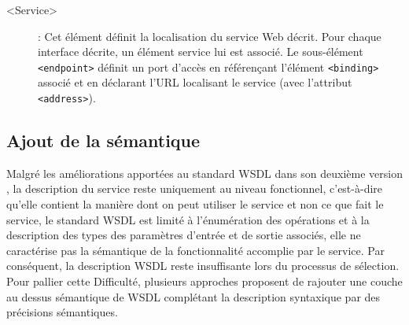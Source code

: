 \begin{description}
	    \item[<Service>]:
		Cet élément définit la localisation du service Web décrit. Pour chaque
		interface décrite, un élément service lui est associé. Le sous-élément \texttt{<endpoint>} définit un
		port d’accès en référençant l’élément \texttt{<binding>} associé et en déclarant l'\textsc{URL} 
		localisant le service (avec l’attribut \texttt{<address>}). 	    	



	\end{description}

        \subsection{Ajout de la sémantique}
	    Malgré les améliorations apportées au standard \textsc{WSDL} dans son deuxième version
	    \cite{chinnici2007web}, la description du service reste uniquement au niveau fonctionnel, 
	    c'est-à-dire qu'elle contient la manière dont on peut utiliser le service et non ce
	    que fait le service, le standard \textsc{WSDL} est limité à l'énumération des opérations et 
	    à la description des types des paramètres d'entrée et de sortie associés, elle ne caractérise 
	    pas la sémantique de la fonctionnalité accomplie par le service. Par conséquent, la description
	    \textsc{WSDL} reste insuffisante lors du processus de sélection. 
	    Pour pallier cette Difficulté, plusieurs approches proposent de rajouter 
	    une couche au dessus sémantique de \textsc{WSDL} complétant la description syntaxique par 
	    des précisions sémantiques.\\

